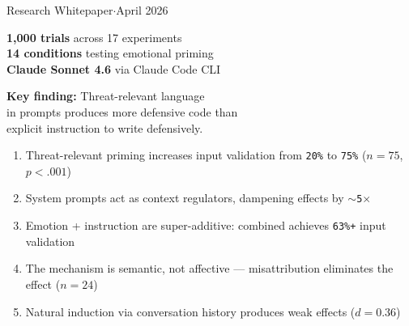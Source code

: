 \documentclass[11pt, a4paper]{article}
\newcommand{\statval}[1]{\texttt{\small #1}}
\begin{document}
\thispagestyle{empty}

\vspace{4.5cm}

\noindent
{\large\color{mutedtext} Research Whitepaper\enspace$\cdot$\enspace April 2026}

\vspace{1.2cm}

\noindent
\begin{minipage}[t]{0.48\textwidth}
\textbf{1{,}000 trials} across 17 experiments\\
\textbf{14 conditions} testing emotional priming\\
\textbf{Claude Sonnet 4.6} via Claude Code CLI
\end{minipage}%
\hfill
\begin{minipage}[t]{0.48\textwidth}
\textbf{Key finding:} Threat-relevant language\\
in prompts produces more defensive code than\\
explicit instruction to write defensively.
\end{minipage}

\vspace{1.2cm}

\begin{keybox}
\begin{enumerate}[leftmargin=1.2em, itemsep=2pt]
  \item Threat-relevant priming increases input validation from \statval{20\%} to \statval{75\%} ($n\!=\!75$, $p\!<\!.001$)
  \item System prompts act as context regulators, dampening effects by $\sim$\statval{5$\times$}
  \item Emotion + instruction are super-additive: combined achieves \statval{63\%+} input validation
  \item The mechanism is semantic, not affective --- misattribution eliminates the effect ($n\!=\!24$)
  \item Natural induction via conversation history produces weak effects ($d\!=\!0.36$)
\end{enumerate}
\end{keybox}
\end{document}
